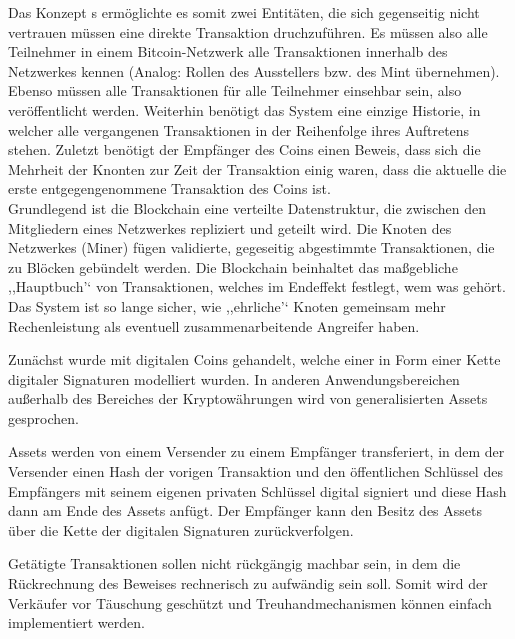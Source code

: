     Das Konzept \citeauthor{Nakamoto2008}s ermöglichte es somit zwei Entitäten, die sich gegenseitig nicht vertrauen müssen eine direkte Transaktion druchzuführen.
    Es müssen also alle Teilnehmer in einem Bitcoin-Netzwerk alle Transaktionen innerhalb des Netzwerkes kennen (Analog: Rollen des Ausstellers bzw. des Mint übernehmen).
    Ebenso müssen alle Transaktionen für alle Teilnehmer einsehbar sein, also veröffentlicht werden.
    Weiterhin benötigt das System eine einzige Historie, in welcher alle vergangenen Transaktionen in der Reihenfolge ihres Auftretens stehen.
    Zuletzt benötigt der Empfänger des Coins einen Beweis, dass sich die Mehrheit der Knonten zur Zeit der Transaktion einig waren, dass die aktuelle die erste entgegengenommene Transaktion des Coins ist. 
    \cite{Nakamoto2008}
    \medskip\\
    
    \noindent Grundlegend ist die Blockchain eine verteilte Datenstruktur, die zwischen den Mitgliedern eines Netzwerkes repliziert und geteilt wird\cite{Christidis2016}.
    Die Knoten des Netzwerkes (Miner) fügen validierte, gegeseitig abgestimmte Transaktionen, die zu Blöcken gebündelt werden.
    Die Blockchain beinhaltet das maßgebliche ,,Hauptbuch'` von Transaktionen, welches im Endeffekt festlegt, wem was gehört.
    Das System ist so lange sicher, wie ,,ehrliche'` Knoten gemeinsam mehr Rechenleistung als eventuell zusammenarbeitende Angreifer haben\cite{Nakamoto2008}.
    
    Zunächst wurde mit digitalen Coins gehandelt, welche einer in Form einer Kette digitaler Signaturen modelliert wurden.
    In anderen Anwendungsbereichen außerhalb des Bereiches der Kryptowährungen wird von generalisierten Assets gesprochen.
    \begin{figure}[H]
    \end{figure}
    
    Assets werden von einem Versender zu einem Empfänger transferiert, in dem der Versender einen Hash der vorigen Transaktion und den öffentlichen Schlüssel des Empfängers mit seinem eigenen privaten Schlüssel digital signiert und diese Hash dann am Ende des Assets anfügt.
    Der Empfänger kann den Besitz des Assets über die Kette der digitalen Signaturen zurückverfolgen\cite{Nakamoto2008}.
    
    Getätigte Transaktionen sollen nicht rückgängig machbar sein, in dem die Rückrechnung des Beweises rechnerisch zu aufwändig sein soll\cite{Nakamoto2008}.
    Somit wird der Verkäufer vor Täuschung geschützt und Treuhandmechanismen können einfach implementiert werden\cite{Nakamoto2008}.  
    
